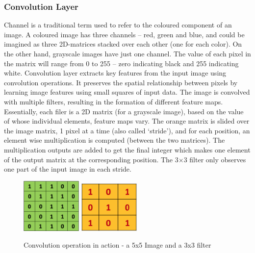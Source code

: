 \subsubsection*{Convolution Layer}
\label{sect5_1_2_1a_a}
Channel is a traditional term used to refer to the coloured component of an image. A coloured image has three channels – red, green and blue, and could be imagined as three 2D-matrices stacked over each other (one for each color).\newline\newline
On the other hand, grayscale images have just one channel. The value of each pixel in the matrix will range from 0 to 255 – zero indicating black and 255 indicating white. Convolution layer extracts key features from the input image using convolution operations. It preserves the spatial relationship between pixels by learning image features using small squares of input data.\newline\newline
The image is convolved with multiple filters, resulting in the formation of different feature maps. Essentially, each filer is a 2D matrix (for a grayscale image), based on the value of whose individual elements, feature maps vary. \newline\newline
The orange matrix is slided over the image matrix, 1 pixel  at a time (also called ‘stride’), and for each position, an element wise multiplication is computed (between the two matrices). The multiplication outputs are added to get the final integer which makes one element of the output matrix at the corresponding position. The 3×3 filter only observes one part of the input image in each stride.\newline\newline
\begin{figure}[h!]
\centering
\includegraphics[width=3cm]{figures/Image.png}
\hspace{4mm}
\includegraphics[width=3cm]{figures/Filter.png}
\caption{Convolution operation in action - a 5x5 Image  and a 3x3 filter}
\label{fig:cnn8}
\end{figure}
